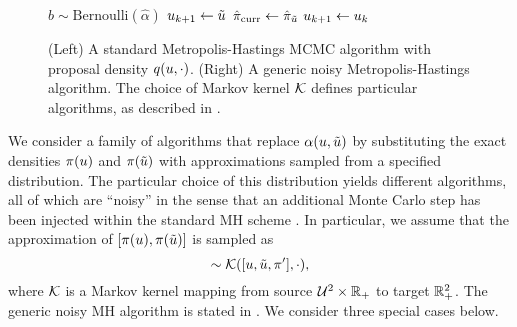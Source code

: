 \documentclass[12pt]{article}
\begin{document}
\begin{figure}[ht]
\begin{minipage}[t]{0.495\textwidth}
\begin{algorithmic}[1]
            \State $b \sim \text{Bernoulli}(\hat{\alpha})$
                \State $u_{k+1} \gets \tilde{u}$
                \State $\hat{\pi}_{\text{curr}} \gets \hat{\pi}_{\tilde{u}}$
            \Else
                \State $u_{k+1} \gets u_k$
            \EndIf
        \EndFor
    \EndFunction
    \end{algorithmic}
\end{minipage}
\caption{(Left) A standard Metropolis-Hastings MCMC algorithm with proposal density $q(u, \cdot)$.
(Right) A generic noisy Metropolis-Hastings algorithm. The choice of Markov kernel $\mathcal{K}$ 
defines particular algorithms, as described in .}
\end{figure}

We consider a family of algorithms that replace $\alpha(u, \tilde{u})$ by
substituting the exact densities $\pi(u)$  and $\pi(\tilde{u})$ 
with approximations sampled from a specified distribution. The particular choice of 
this distribution yields different algorithms, all of which are ``noisy'' in the sense that 
an additional Monte Carlo step has been injected within the standard MH scheme
\citep{noisyMCSurvey,noisyMCMC,stabilityNoisyMH}. In particular, we assume 
that the approximation of $[\pi(u), \pi(\tilde{u})]$ is sampled as
\begin{equation}
[\hat{\postDens}_{\Par}, \hat{\postDens}_{\propPar}] \sim \postSampleKernel([\Par, \propPar, \postDens^\prime], \cdot),
\end{equation}
where $\mathcal{K}$ is a Markov kernel mapping from source $\mathcal{U}^2 \times \mathbb{R}_+$
to target $\mathbb{R}^2_{+}$. The generic noisy MH algorithm is stated in . 
We consider three special cases below.
\end{document}
